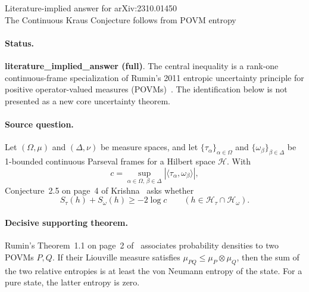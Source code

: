 \documentclass[11pt]{article}
\newcommand{\Hh}{\mathcal H}
\begin{document}
\begin{center}
{\Large Literature-implied answer for arXiv:2310.01450}\\[4pt]
{\large The Continuous Kraus Conjecture follows from POVM entropy}
\end{center}

\paragraph{Status.}
\textbf{literature\_implied\_answer (full)}.  The central inequality is a
rank-one continuous-frame specialization of Rumin's 2011 entropic uncertainty
principle for positive operator-valued measures (POVMs)~\cite{Rumin}.  The
identification below is not presented as a new core uncertainty theorem.

\paragraph{Source question.}
Let $(\Omega,\mu)$ and $(\Delta,\nu)$ be measure spaces, and let
$\{\tau_\alpha\}_{\alpha\in\Omega}$ and
$\{\omega_\beta\}_{\beta\in\Delta}$ be 1-bounded continuous Parseval
frames for a Hilbert space $\Hh$.  With
\[
 c=\sup_{\alpha\in\Omega,\,\beta\in\Delta}
       |\langle\tau_\alpha,\omega_\beta\rangle|,
\]
Conjecture~2.5 on page~4 of Krishna~\cite{Krishna2023} asks whether
\[
 S_\tau(h)+S_\omega(h)\ge -2\log c
 \qquad(h\in\Hh_\tau\cap\Hh_\omega).
 \tag{CK}
\]

\paragraph{Decisive supporting theorem.}
Rumin's Theorem~1.1 on page~2 of~\cite{Rumin} associates probability
densities to two POVMs $P,Q$.  If their Liouville measure satisfies
$\mu_{PQ}\le \mu_P\otimes\mu_Q$, then the sum of the two relative entropies
is at least the von Neumann entropy of the state.  For a pure state, the
latter entropy is zero.
\end{document}
